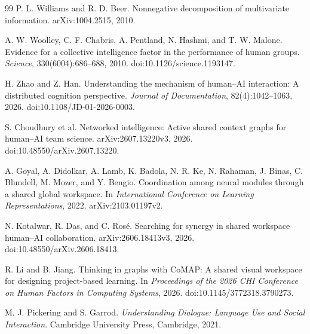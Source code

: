 \documentclass[11pt,oneside,openany]{book}
\numberwithin{equation}{section}
\begin{document}
\begin{thebibliography}{99}
P. L. Williams and R. D. Beer.
\newblock Nonnegative decomposition of multivariate information.
\newblock arXiv:1004.2515, 2010.

A. W. Woolley, C. F. Chabris, A. Pentland, N. Hashmi, and T. W. Malone.
\newblock Evidence for a collective intelligence factor in the performance of human groups.
\newblock \emph{Science}, 330(6004):686--688, 2010.
\newblock doi:10.1126/science.1193147.

H. Zhao and Z. Han.
\newblock Understanding the mechanism of human--AI interaction: A distributed cognition perspective.
\newblock \emph{Journal of Documentation}, 82(4):1042--1063, 2026.
\newblock doi:10.1108/JD-01-2026-0003.


S. Choudhury et al.
\newblock Networked intelligence: Active shared context graphs for human--AI team science.
\newblock arXiv:2607.13220v3, 2026.
\newblock doi:10.48550/arXiv.2607.13220.

A. Goyal, A. Didolkar, A. Lamb, K. Badola, N. R. Ke, N. Rahaman, J. Binas,
C. Blundell, M. Mozer, and Y. Bengio.
\newblock Coordination among neural modules through a shared global workspace.
\newblock In \emph{International Conference on Learning Representations}, 2022.
\newblock arXiv:2103.01197v2.

N. Kotalwar, R. Das, and C. Ros\'e.
\newblock Searching for synergy in shared workspace human--AI collaboration.
\newblock arXiv:2606.18413v3, 2026.
\newblock doi:10.48550/arXiv.2606.18413.

R. Li and B. Jiang.
\newblock Thinking in graphs with CoMAP: A shared visual workspace for designing project-based learning.
\newblock In \emph{Proceedings of the 2026 CHI Conference on Human Factors in Computing Systems}, 2026.
\newblock doi:10.1145/3772318.3790273.

M. J. Pickering and S. Garrod.
\newblock \emph{Understanding Dialogue: Language Use and Social Interaction}.
\newblock Cambridge University Press, Cambridge, 2021.

\end{thebibliography}
\end{document}

